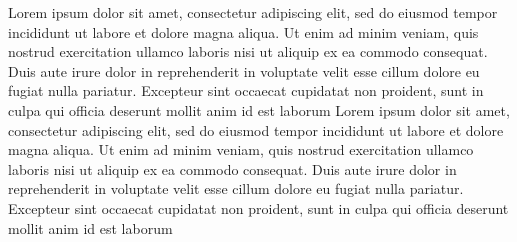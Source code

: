 Lorem ipsum dolor sit amet, consectetur adipiscing elit, sed do eiusmod tempor incididunt ut labore et dolore magna aliqua. Ut enim ad minim veniam, quis nostrud exercitation ullamco laboris nisi ut aliquip ex ea commodo consequat. Duis aute irure dolor in reprehenderit in voluptate velit esse cillum dolore eu fugiat nulla pariatur. Excepteur sint occaecat cupidatat non proident, sunt in culpa qui officia deserunt mollit anim id est laborum
Lorem ipsum dolor sit amet, consectetur adipiscing elit, sed do eiusmod tempor incididunt ut labore et dolore magna aliqua. Ut enim ad minim veniam, quis nostrud exercitation ullamco laboris nisi ut aliquip ex ea commodo consequat. Duis aute irure dolor in reprehenderit in voluptate velit esse cillum dolore eu fugiat nulla pariatur. Excepteur sint occaecat cupidatat non proident, sunt in culpa qui officia deserunt mollit anim id est laborum

